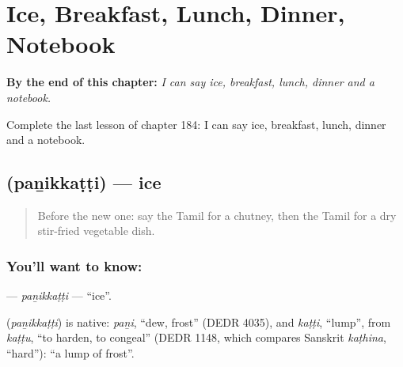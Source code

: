 
\chapter{Ice, Breakfast, Lunch, Dinner, Notebook}
\label{ch:ta-ice-breakfast-lunch-dinner-notebook}

\begin{chapteropening}
\textbf{By the end of this chapter:} \emph{I can say ice, breakfast, lunch, dinner and a notebook.}

Complete the last lesson of chapter 184: I can say ice, breakfast, lunch, dinner and a notebook.
\end{chapteropening}

\section[\texorpdfstring{\ta{பனிக்கட்டி} (paṉikkaṭṭi)}{பனிக்கட்டி (paṉikkaṭṭi)}]{ (paṉikkaṭṭi) — ice}

\label{lesson:TA-C184-panikkatti}



\begin{quote}
Before the new one: say the Tamil for a chutney, then the Tamil for a dry stir-fried vegetable dish.
\end{quote}

\subsection*{You'll want to know: }
\textbf{} — \emph{paṉikkaṭṭi} — \textquotedblleft{}ice\textquotedblright{}.

\begin{cousinweb}
\textbf{} (\emph{paṉikkaṭṭi}) is native: \emph{paṉi}, \textquotedblleft{}dew, frost\textquotedblright{} (DEDR 4035), and \emph{kaṭṭi}, \textquotedblleft{}lump\textquotedblright{}, from \emph{kaṭṭu}, \textquotedblleft{}to harden, to congeal\textquotedblright{} (DEDR 1148, which compares Sanskrit \emph{kaṭhina}, \textquotedblleft{}hard\textquotedblright{}): \textquotedblleft{}a lump of frost\textquotedblright{}.
\end{cousinweb}

